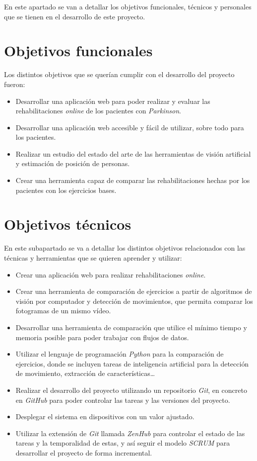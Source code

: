 
En este apartado se van a detallar los objetivos funcionales, técnicos y personales que se tienen en el desarrollo de este proyecto.

\section{Objetivos funcionales}
Los distintos objetivos que se querían cumplir con el desarrollo del proyecto fueron:
\begin{itemize}
	\item Desarrollar una aplicación web para poder realizar y evaluar las rehabilitaciones \textit{online} de los pacientes con \textit{Parkinson}.
	\item Desarrollar una aplicación web accesible y fácil de utilizar, sobre todo para los pacientes.
	\item Realizar un estudio del estado del arte de las herramientas de visión artificial y estimación de posición de personas.
	\item Crear una herramienta capaz de comparar las rehabilitaciones hechas por los pacientes con los ejercicios bases.
\end{itemize}

\section{Objetivos técnicos}
En este subapartado se va a detallar los distintos objetivos relacionados con las técnicas y herramientas que se quieren aprender y utilizar:
\begin{itemize}
	\item Crear una aplicación web para realizar rehabilitaciones \textit{online}.
	\item Crear una herramienta de comparación de ejercicios a partir de algoritmos de visión por computador y detección de movimientos, que permita comparar los fotogramas de un mismo vídeo.
	\item Desarrollar una herramienta de comparación que utilice el mínimo tiempo y memoria posible para poder trabajar con flujos de datos.
	\item Utilizar el lenguaje de programación \textit{Python} para la comparación de ejercicios, donde se incluyen tareas de inteligencia artificial para la detección de movimiento, extracción de características\ldots
	\item Realizar el desarrollo del proyecto utilizando un repositorio \textit{Git}, en concreto en \textit{GitHub} para poder controlar las tareas y las versiones del proyecto.
	\item Desplegar el sistema en dispositivos con un valor ajustado.
	\item Utilizar la extensión de \textit{Git} llamada \textit{ZenHub} para controlar el estado de las tareas y la temporalidad de estas, y así seguir el modelo \textit{SCRUM} para desarrollar el proyecto de forma incremental.
\end{itemize}


